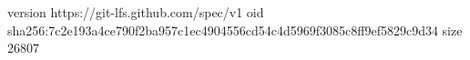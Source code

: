 version https://git-lfs.github.com/spec/v1
oid sha256:7c2e193a4ce790f2ba957c1ec4904556cd54c4d5969f3085c8ff9ef5829c9d34
size 26807
